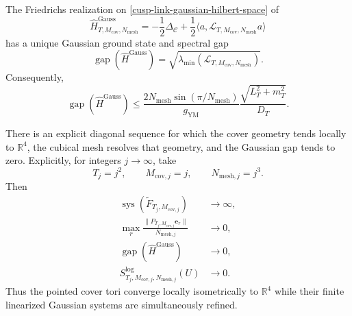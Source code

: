 \begin{theorem}
\label{cusp-link-gaussian-theorem}
The Friedrichs realization on \eqref{cusp-link-gaussian-hilbert-space} of
\begin{equation}
 \widehat H^{\mathrm{Gauss}}_{T,M_{\mathrm{cov}},N_{\mathrm{mesh}}}
 =-\frac12\Delta_{\mathscr C}
  +\frac12\langle a,
     \mathcal L_{T,M_{\mathrm{cov}},N_{\mathrm{mesh}}}a\rangle
 \label{cusp-link-gaussian-hamiltonian}
\end{equation}
has a unique Gaussian ground state and spectral gap
\begin{equation}
 \operatorname{gap}(\widehat H^{\mathrm{Gauss}})
 =\sqrt{\lambda_{\min}(
   \mathcal L_{T,M_{\mathrm{cov}},N_{\mathrm{mesh}}})}.
 \label{cusp-link-gaussian-gap}
\end{equation}
Consequently,
\begin{equation}
 \operatorname{gap}(\widehat H^{\mathrm{Gauss}})
 \leq
 \frac{2N_{\mathrm{mesh}}\sin(\pi/N_{\mathrm{mesh}})}{g_{\mathrm{YM}}}
 \frac{\sqrt{L_T^2+m_T^2}}{D_T}.
 \label{cusp-link-gaussian-gap-bound}
\end{equation}

There is an explicit diagonal sequence for which the cover geometry tends locally to
\(\mathbb R^4\), the cubical mesh resolves that geometry, and the Gaussian
gap tends to zero.  Explicitly, for integers \(j\to\infty\), take
\begin{equation}
 T_j=j^2,\qquad M_{\mathrm{cov},j}=j,\qquad
 N_{\mathrm{mesh},j}=j^3.
 \label{cusp-link-diagonal-sequence}
\end{equation}
Then
\begin{equation}
 \begin{aligned}
 \operatorname{sys}(\widetilde F_{T_j,M_{\mathrm{cov},j}})
 &\longrightarrow\infty,\\
 \max_r
 \frac{\lVert P_{T_j,M_{\mathrm{cov},j}}\mathbf e_r\rVert}
      {N_{\mathrm{mesh},j}}
 &\longrightarrow0,\\
 \operatorname{gap}(\widehat H^{\mathrm{Gauss}})
 &\longrightarrow0,\\
 S^{\log}_{T_j,M_{\mathrm{cov},j},N_{\mathrm{mesh},j}}(U)
 &\longrightarrow0.
 \end{aligned}
 \label{cusp-link-diagonal-conclusions}
\end{equation}
Thus the pointed cover tori converge locally isometrically to \(\mathbb R^4\)
while their finite linearized Gaussian systems are simultaneously refined.
\end{theorem}

